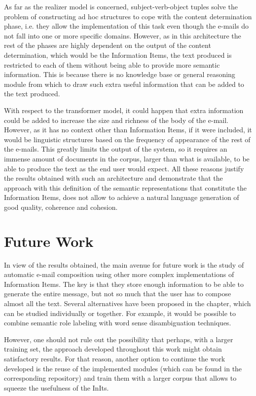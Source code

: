 As far as the realizer model is concerned, subject-verb-object tuples solve the problem of constructing ad hoc structures to cope with the content determination phase, i.e. they allow the implementation of this task even though the e-mails do not fall into one or more specific domains. However, as in this architecture the rest of the phases are highly dependent on the output of the content determination, which would be the Information Items, the text produced is restricted to each of them without being able to provide more semantic information. This is because there is no knowledge base or general reasoning module from which to draw such extra useful information that can be added to the text produced.

With respect to the transformer model, it could happen that extra information could be added to increase the size and richness of the body of the e-mail. However, as it has no context other than Information Items, if it were included, it would be linguistic structures based on the frequency of appearance of the rest of the e-mails. This greatly limits the output of the system, so it requires an immense amount of documents in the corpus, larger than what is available, to be able to produce the text as the end user would expect. All these reasons justify the results obtained with such an architecture and demonstrate that the approach with this definition of the semantic representations that constitute the Information Items, does not allow to achieve a natural language generation of good quality, coherence and cohesion.

\section{Future Work}\label{s:fute}
In view of the results obtained, the main avenue for future work is the study of automatic e-mail composition using other more complex implementations of Information Items. The key is that they store enough information to be able to generate the entire message, but not so much that the user has to compose almost all the text. Several alternatives have been proposed in the chapter, which can be studied individually or together. For example, it would be possible to combine semantic role labeling with word sense disambiguation techniques.

However, one should not rule out the possibility that perhaps, with a larger training set, the approach developed throughout this work might obtain satisfactory results. For that reason, another option to continue the work developed is the reuse of the implemented modules (which can be found in the corresponding repository) and train them with a larger corpus that allows to squeeze the usefulness of the InIts.

